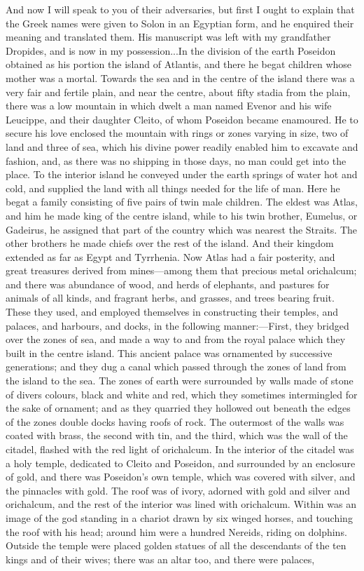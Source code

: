 \documentclass[11pt,letter]{article}
\begin{document}
\par  And now I will speak to you of their adversaries, but first I ought to explain that the Greek names were given to Solon in an Egyptian form, and he enquired their meaning and translated them. His manuscript was left with my grandfather Dropides, and is now in my possession...In the division of the earth Poseidon obtained as his portion the island of Atlantis, and there he begat children whose mother was a mortal. Towards the sea and in the centre of the island there was a very fair and fertile plain, and near the centre, about fifty stadia from the plain, there was a low mountain in which dwelt a man named Evenor and his wife Leucippe, and their daughter Cleito, of whom Poseidon became enamoured. He to secure his love enclosed the mountain with rings or zones varying in size, two of land and three of sea, which his divine power readily enabled him to excavate and fashion, and, as there was no shipping in those days, no man could get into the place. To the interior island he conveyed under the earth springs of water hot and cold, and supplied the land with all things needed for the life of man. Here he begat a family consisting of five pairs of twin male children. The eldest was Atlas, and him he made king of the centre island, while to his twin brother, Eumelus, or Gadeirus, he assigned that part of the country which was nearest the Straits. The other brothers he made chiefs over the rest of the island. And their kingdom extended as far as Egypt and Tyrrhenia. Now Atlas had a fair posterity, and great treasures derived from mines—among them that precious metal orichalcum; and there was abundance of wood, and herds of elephants, and pastures for animals of all kinds, and fragrant herbs, and grasses, and trees bearing fruit. These they used, and employed themselves in constructing their temples, and palaces, and harbours, and docks, in the following manner:—First, they bridged over the zones of sea, and made a way to and from the royal palace which they built in the centre island. This ancient palace was ornamented by successive generations; and they dug a canal which passed through the zones of land from the island to the sea. The zones of earth were surrounded by walls made of stone of divers colours, black and white and red, which they sometimes intermingled for the sake of ornament; and as they quarried they hollowed out beneath the edges of the zones double docks having roofs of rock. The outermost of the walls was coated with brass, the second with tin, and the third, which was the wall of the citadel, flashed with the red light of orichalcum. In the interior of the citadel was a holy temple, dedicated to Cleito and Poseidon, and surrounded by an enclosure of gold, and there was Poseidon's own temple, which was covered with silver, and the pinnacles with gold. The roof was of ivory, adorned with gold and silver and orichalcum, and the rest of the interior was lined with orichalcum. Within was an image of the god standing in a chariot drawn by six winged horses, and touching the roof with his head; around him were a hundred Nereids, riding on dolphins. Outside the temple were placed golden statues of all the descendants of the ten kings and of their wives; there was an altar too, and there were palaces, 
\end{document}
